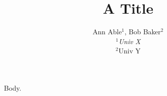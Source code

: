 \documentclass{article}
\begin{document}
\title{A Title}
\author{\begin{tabular}{c}Ann Able$^1$, Bob Baker$^2$\\ $^1$\it Univ X\\ $^2$\small Univ Y\end{tabular}}
\maketitle
Body.
\end{document}
